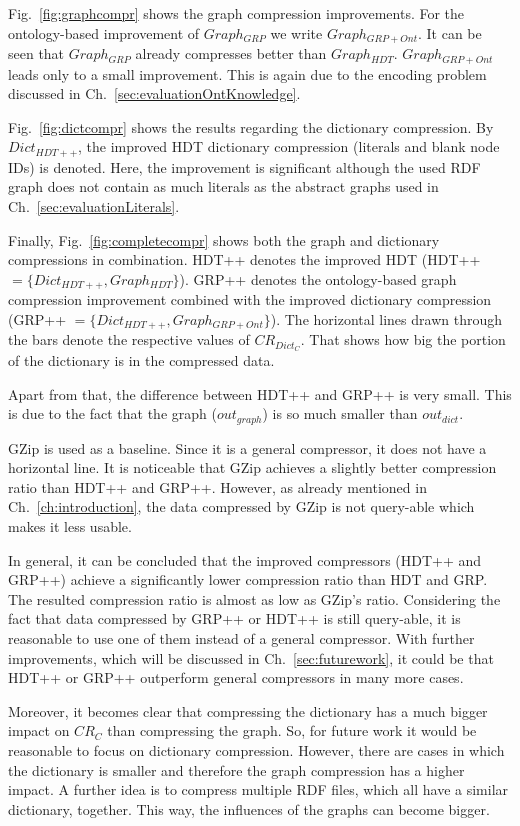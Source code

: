 \FloatBarrier
Fig.~\ref{fig:graphcompr} shows the graph compression improvements. For the ontology-based improvement of $Graph_{GRP}$ we write $Graph_{GRP+Ont}$.  It can be seen that $Graph_{GRP}$ already compresses better than $Graph_{HDT}$. $Graph_{GRP+Ont}$ leads only to a small improvement. This is again due to the encoding problem discussed in Ch.~\ref{sec:evaluationOntKnowledge}.

Fig.~\ref{fig:dictcompr} shows the results regarding the dictionary compression. By $Dict_{HDT++}$, the improved HDT dictionary compression (literals and blank node IDs) is denoted. Here, the improvement is significant although the used RDF graph does not contain as much literals as the abstract graphs used in Ch.~\ref{sec:evaluationLiterals}. 

Finally, Fig.~\ref{fig:completecompr} shows both the graph and dictionary compressions in combination. HDT++ denotes the improved HDT (HDT++$=\{  Dict_{HDT++}, Graph_{HDT} \} $). GRP++ denotes the ontology-based graph compression improvement combined with the improved dictionary compression (GRP++ $=\{ Dict_{HDT++}, Graph_{GRP+Ont} \}$). The horizontal lines drawn through the bars denote the respective values of $CR_{Dict_C}$. That shows how big the portion of the dictionary is in the compressed data. 

Apart from that, the difference between HDT++ and GRP++ is very small. This is due to the fact that the graph ($out_{graph}$) is so much smaller than $out_{dict}$.

GZip is used as a baseline. Since it is a general compressor, it does not have a horizontal line. It is noticeable that GZip achieves a slightly better compression ratio than HDT++ and GRP++. However, as already mentioned in Ch.~\ref{ch:introduction}, the data compressed by GZip is not query-able which makes it less usable.

In general, it can be concluded that the improved compressors (HDT++ and GRP++) achieve a significantly lower compression ratio than HDT and GRP. The resulted compression ratio is almost as low as GZip's ratio. Considering the fact that data compressed by GRP++ or HDT++ is still query-able, it is reasonable to use one of them instead of a general compressor. With further improvements, which will be discussed in Ch.~\ref{sec:futurework}, it could be that HDT++ or GRP++ outperform general compressors in many more cases.

Moreover, it becomes clear that compressing the dictionary has a much bigger impact on $CR_C$ than compressing the graph. So, for future work it would be reasonable to focus on dictionary compression. However, there are cases in which the dictionary is smaller and therefore the graph compression has a higher impact. A further idea is to compress multiple RDF files, which all have a similar dictionary, together. This way, the influences of the graphs can become bigger.



